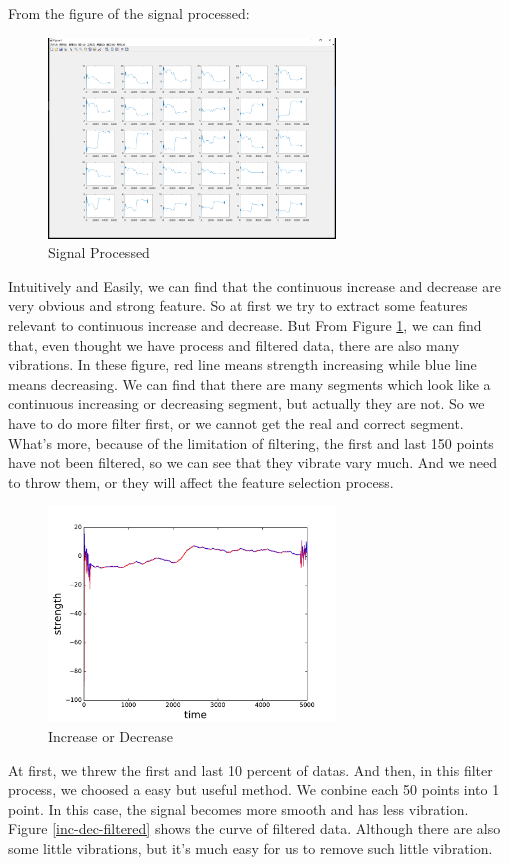 \documentclass[conference]{IEEEtran}
\begin{document}
From the figure of the signal processed:
\begin{figure}[H]
\centering
\includegraphics[width=3in]{PUSH1.png}
\caption{Signal Processed}
\end{figure}
Intuitively and Easily, we can find that the continuous increase and decrease are very obvious and strong feature. So at first we try to extract some features relevant to continuous increase and decrease. But From Figure \ref{inc-dec}, we can find that, even thought we have process and filtered data, there are also many vibrations. In these figure, red line means strength increasing while blue line means decreasing. We can find that there are many segments which look like a continuous increasing or decreasing segment, but actually they are not. So we have to do more filter first, or we cannot get the real and correct segment. What's more, because of the limitation of filtering, the first and last 150 points have not been filtered, so we can see that they vibrate vary much. And we need to throw them, or they will affect the feature selection process.

\begin{figure}[H]
\label{inc-dec}
\centering
\includegraphics[width=3in]{fs1.pdf}
\caption{Increase or Decrease}
\end{figure}

At first, we threw the first and last 10 percent of datas. And then, in this filter process, we choosed a easy but useful method. We conbine each 50 points into 1 point. In this case, the signal becomes more smooth and has less vibration. Figure \ref{inc-dec-filtered} shows the curve of filtered data. Although there are also some little vibrations, but it's much easy for us to remove such little vibration.
\end{document}
